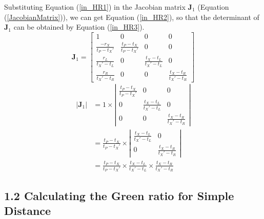 \documentclass{bmcart}
\begin{document}
\begin{backmatter}
Substituting Equation (\ref{in_HR1}) in the Jacobian matrix ${{\mathbf{J}}_1}$ (Equation (\ref{JacobianMatrix})), we can get Equation (\ref{in_HR2}), so that the determinant of ${{\mathbf{J}}_1}$ can be obtained by Equation (\ref{in_HR3}).
\begin{equation}\label{in_HR2}
{{\mathbf{J}}_1} = \left[ {\begin{array}{*{20}{c}}
  1&0&0&0 \\
  {\frac{{ - {r_X}}}{{{t_P} - {t_X}'}}}&{\frac{{{t_P} - {t_X}}}{{{t_P} - {t_X}'}}}&0&0 \\
  {\frac{{{r_L}}}{{{t_X}' - {t_L}}}}&0&{\frac{{{t_X} - {t_L}}}{{{t_X}' - {t_L}}}}&0 \\
  {\frac{{{r_R}}}{{{t_X}' - {t_R}}}}&0&0&{\frac{{{t_X} - {t_R}}}{{{t_X}' - {t_R}}}}
\end{array}} \right]
\end{equation}
\begin{equation}\label{in_HR3}
\begin{aligned}
\left| {{{\mathbf{J}}_1}} \right| &= 1 \times \left| {\begin{array}{*{20}{c}}
  {\frac{{{t_P} - {t_X}}}{{{t_P} - {t_X}'}}}&0&0 \\
  0&{\frac{{{t_X} - {t_L}}}{{{t_X}' - {t_L}}}}&0 \\
  0&0&{\frac{{{t_X} - {t_R}}}{{{t_X}' - {t_R}}}}
\end{array}} \right| \\&= \frac{{{t_P} - {t_X}}}{{{t_P} - {t_X}'}} \times \left| {\begin{array}{*{20}{c}}
  {\frac{{{t_X} - {t_L}}}{{{t_X}' - {t_L}}}}&0 \\
  0&{\frac{{{t_X} - {t_R}}}{{{t_X}' - {t_R}}}}
\end{array}} \right| \\&= \frac{{{t_P} - {t_X}}}{{{t_P} - {t_X}'}} \times \frac{{{t_X} - {t_L}}}{{{t_X}' - {t_L}}} \times \frac{{{t_X} - {t_R}}}{{{t_X}' - {t_R}}}
\end{aligned}
\end{equation}

\subsection*{1.2 Calculating the Green ratio for Simple Distance}


\end{backmatter}
\end{document}
